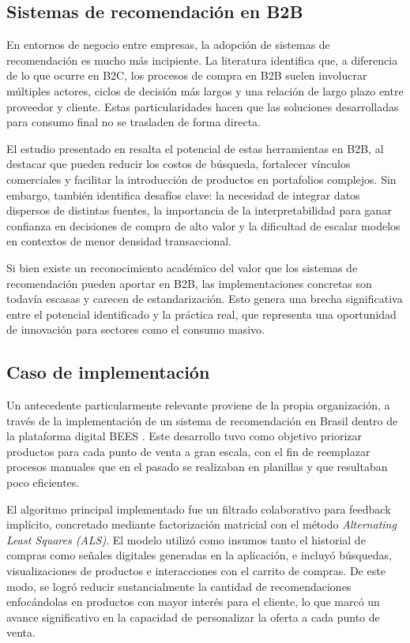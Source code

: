 \subsection{Sistemas de recomendación en B2B}

En entornos de negocio entre empresas, la adopción de sistemas de recomendación es mucho más incipiente. La literatura identifica que, a diferencia de lo que ocurre en B2C, los procesos de compra en B2B suelen involucrar múltiples actores, ciclos de decisión más largos y una relación de largo plazo entre proveedor y cliente. Estas particularidades hacen que las soluciones desarrolladas para consumo final no se trasladen de forma directa.

El estudio presentado en \cite{ARTICLE:1} resalta el potencial de estas herramientas en B2B, al destacar que pueden reducir los costos de búsqueda, fortalecer vínculos comerciales y facilitar la introducción de productos en portafolios complejos. Sin embargo, también identifica desafíos clave: la necesidad de integrar datos dispersos de distintas fuentes, la importancia de la interpretabilidad para ganar confianza en decisiones de compra de alto valor y la dificultad de escalar modelos en contextos de menor densidad transaccional.

Si bien existe un reconocimiento académico del valor que los sistemas de recomendación pueden aportar en B2B, las implementaciones concretas son todavía escasas y carecen de estandarización. Esto genera una brecha significativa entre el potencial identificado y la práctica real, que representa una oportunidad de innovación para sectores como el consumo masivo.

\subsection{Caso de implementación}

Un antecedente particularmente relevante proviene de la propia organización, a través de la implementación de un sistema de recomendación en Brasil dentro de la plataforma digital BEES \cite{REPORT:1}. Este desarrollo tuvo como objetivo priorizar productos para cada punto de venta a gran escala, con el fin de reemplazar procesos manuales que en el pasado se realizaban en planillas y que resultaban poco eficientes.

El algoritmo principal implementado fue un filtrado colaborativo para feedback implícito, concretado mediante factorización matricial con el método \textit{Alternating Least Squares (ALS)}. El modelo utilizó como insumos tanto el historial de compras como señales digitales generadas en la aplicación, e incluyó búsquedas, visualizaciones de productos e interacciones con el carrito de compras. De este modo, se logró reducir sustancialmente la cantidad de recomendaciones enfocándolas en productos con mayor interés para el cliente, lo que marcó un avance significativo en la capacidad de personalizar la oferta a cada punto de venta.

